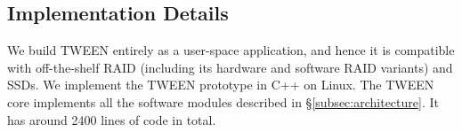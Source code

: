 %
%
%
%

\subsection{Implementation Details}
\label{subsec:implementation}

We build TWEEN entirely as a user-space application, and hence it is
compatible with off-the-shelf RAID (including its hardware and software RAID
variants) and SSDs.   We implement the TWEEN prototype in C++ on Linux.  The
TWEEN core implements all the software modules described in
\S\ref{subsec:architecture}.  It has around \num{2400} lines of code
in total. 

